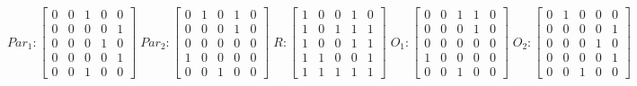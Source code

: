      $$
        Par_{1} : \begin{bmatrix}
            0 & 0 & 1 & 0 & 0 \\
            0 & 0 & 0 & 0 & 1 \\
            0 & 0 & 0 & 1 & 0 \\
			0 & 0 & 0 & 0 & 1 \\
            0 & 0 & 1 & 0 & 0 
        \end{bmatrix}
        \;
        Par_{2} : \begin{bmatrix}
            0 & 1 & 0 & 1 & 0 \\
            0 & 0 & 0 & 1 & 0 \\
            0 & 0 & 0 & 0 & 0 \\
            1 & 0 & 0 & 0 & 0 \\
            0 & 0 & 1 & 0 & 0
        \end{bmatrix}
        \;
        R : \begin{bmatrix}
            1 & 0 & 0 & 1 & 0 \\
            1 & 0 & 1 & 1 & 1 \\
            1 & 0 & 0 & 1 & 1 \\
            1 & 1 & 0 & 0 & 1 \\
            1 & 1 & 1 & 1 & 1
        \end{bmatrix}
        \;
        O_{1} : \begin{bmatrix}
            0 & 0 & 1 & 1 & 0 \\
            0 & 0 & 0 & 1 & 0 \\
            0 & 0 & 0 & 0 & 0 \\
            1 & 0 & 0 & 0 & 0 \\
            0 & 0 & 1 & 0 & 0
        \end{bmatrix}
        \;
        O_{2} : \begin{bmatrix}
            0 & 1 & 0 & 0 & 0 \\
            0 & 0 & 0 & 0 & 1 \\
            0 & 0 & 0 & 1 & 0 \\
            0 & 0 & 0 & 0 & 1 \\
            0 & 0 & 1 & 0 & 0
        \end{bmatrix}
    $$ 
